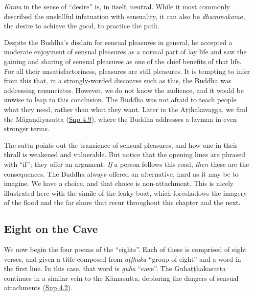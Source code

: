 \documentclass[12pt,openany]{book}%
\begin{document}
\textit{\textsanskrit{Kāma}} in the sense of “desire” is, in itself, neutral. While it most commonly described the unskillful infatuation with sensuality, it can also be \textit{\textsanskrit{dhammakāma}}, the desire to achieve the good, to practice the path.

Despite the Buddha’s disdain for sensual pleasures in general, he accepted a moderate enjoyment of sensual pleasures as a normal part of lay life and saw the gaining and sharing of sensual pleasures as one of the chief benefits of that life. For all their unsatisfactoriness, pleasures are still pleasures. It is tempting to infer from this that, in a strongly-worded discourse such as this, the Buddha was addressing renunciates. However, we do not know the audience, and it would be unwise to leap to this conclusion. The Buddha was not afraid to teach people what they need, rather than what they want. Later in the \textsanskrit{Aṭṭhakavagga}, we find the \textsanskrit{Māgaṇḍiyasutta} (\href{https://suttacentral.net/snp4.9/en/sujato}{Snp 4.9}), where the Buddha addresses a layman in even stronger terms.

The sutta points out the transience of sensual pleasures, and how one in their thrall is weakened and vulnerable. But notice that the opening lines are phrased with “if”; they offer an argument. \emph{If} a person follows this road, \emph{then} these are the consequences. The Buddha always offered an alternative, hard as it may be to imagine. We have a choice, and that choice is non-attachment. This is nicely illustrated here with the simile of the leaky boat, which foreshadows the imagery of the flood and the far shore that recur throughout this chapter and the next.

\subsection*{Eight on the Cave}

We now begin the four poems of the “eights”. Each of these is comprised of eight verses, and given a title composed from \textit{\textsanskrit{aṭṭhaka}} “group of eight” and a word in the first line. In this case, that word is \textit{guha} “cave”. The \textsanskrit{Guhaṭṭhakasutta} continues in a similar vein to the \textsanskrit{Kāmasutta}, deploring the dangers of sensual attachments (\href{https://suttacentral.net/snp4.2/en/sujato}{Snp 4.2}).
\end{document}
